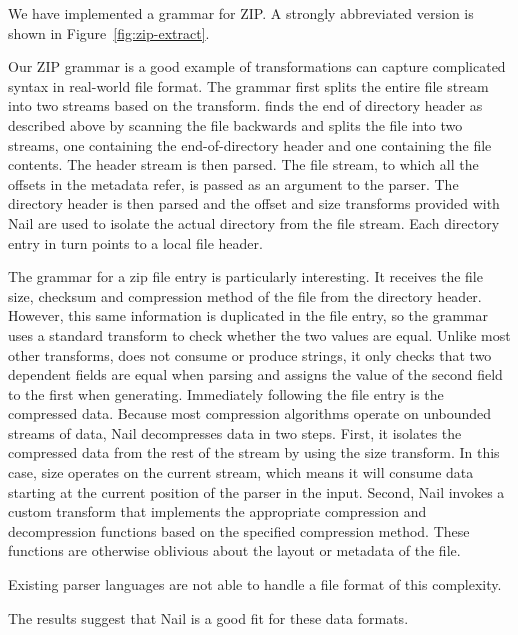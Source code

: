 We have implemented a grammar for ZIP. A strongly abbreviated version is shown in
Figure~\ref{fig:zip-extract}.

Our ZIP grammar is a good example of transformations can capture complicated syntax in real-world
file format. The  grammar first splits the entire file stream into two streams
based on the  transform.
finds the end of directory header as described above by scanning the file backwards and splits the
file into two streams, one containing the end-of-directory header and one containing the file
contents. The header stream is then parsed. The file stream, to which all the offsets in the
metadata refer, is passed as an argument to the  parser.
The directory header is then parsed and the offset and size transforms provided with Nail are used
to isolate the actual directory from the file stream. Each directory entry in turn points to a local
file header. 

The  grammar for a zip file entry is particularly interesting. It receives the file
size, checksum and compression method of the file from the directory header. However, this same
information is duplicated in the file entry, so the grammar uses a standard 
transform to check whether the two values are equal. Unlike most other transforms, 
does not consume or produce strings, it only checks that two dependent fields are equal when parsing
and assigns the value of the second field to the first when generating. Immediately following the
file entry is the compressed data. Because most compression algorithms operate on unbounded streams
of data, Nail decompresses data in two steps.
First, it isolates the compressed data from the rest of the stream by using the size transform. In
this case, size operates on the current stream, which means it will consume data starting at the
current position of the parser in the input.
Second, Nail invokes a custom transform that implements the appropriate compression and decompression
functions based on the specified compression method. These functions are otherwise oblivious about
the layout or metadata of the file.

Existing parser languages are not able to handle a file format of this complexity.

\noindent The results suggest that Nail is a good fit for these data formats. 



